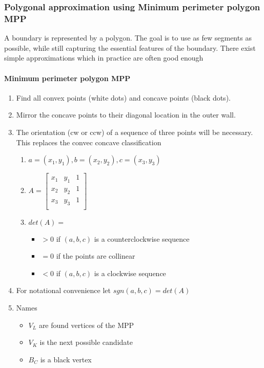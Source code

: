 \subsubsection{Polygonal approximation using Minimum perimeter polygon MPP}
A boundary is represented by a polygon. The goal is to use as few segments as possible, while still capturing the essential features of the boundary. There exist simple approximations which in practice are often good enough\\
\paragraph{Minimum perimeter polygon MPP}
\begin{enumerate}
\item Find all convex points (white dots) and concave points (black dots).
\item Mirror the concave points to their diagonal location in the outer wall.
\item The orientation (cw or ccw) of a sequence of three points will be necessary. This replaces the convec concave classification
\begin{enumerate}
\item $a=(x_1, y_1), b=(x_2, y_2), c=(x_3, y_3)$
\item $A=\begin{bmatrix}
	x_1 & y_1 & 1\\
  	x_2 & y_2 & 1\\
  	x_3 & y_3 & 1\\
\end{bmatrix}$
\item $det(A) =$ 
\begin{itemize}
\item $> 0$ if $(a, b, c)$ is a counterclockwise sequence
\item $= 0$ if the points are collinear
\item $< 0$ if $(a, b, c)$ is a clockwise sequence
\end{itemize}
\end{enumerate}
\item For notational convenience let $sgn(a,b,c) = det(A)$
\item Names
\begin{itemize}
\item $V_L$ are found vertices of the MPP
\item $V_K$ is the next possible candidate
\item $B_C$ is a black vertex

\end{itemize}
\end{enumerate}
